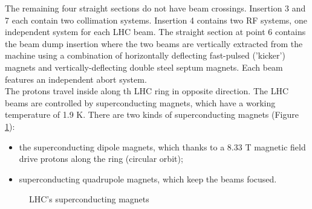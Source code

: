 \documentclass[a4paper, oneside, 11pt, openright]{book}
\begin{document}
					The remaining four straight sections do not have beam crossings. Insertion 3 and 7 each contain two collimation systems. Insertion 4 contains two RF systems, one independent system for each LHC
					beam. The straight section at point 6 contains the beam dump insertion where the two beams are vertically
					extracted from the machine using a combination of horizontally deflecting fast-pulsed ('kicker') magnets and
					vertically-deflecting double steel septum magnets. Each beam features an independent abort system. \cite{LHC design} \\
					The protons travel inside along th LHC ring in opposite direction. The LHC beams are controlled by superconducting magnets, which have a working temperature of 1.9 K. There are two kinds of superconducting magnets (Figure \ref{fig:magnets}):
					\begin{itemize}
						\item the superconducting dipole magnets, which thanks to a 8.33 T magnetic field drive protons along the ring (circular orbit);
						\item superconducting quadrupole magnets, which keep the beams focused.
					\end{itemize} 
					\begin{figure}
						\centering
						 \quad
						\caption{LHC's superconducting magnets}
						\label{fig:magnets}
					\end{figure}
\end{document}
